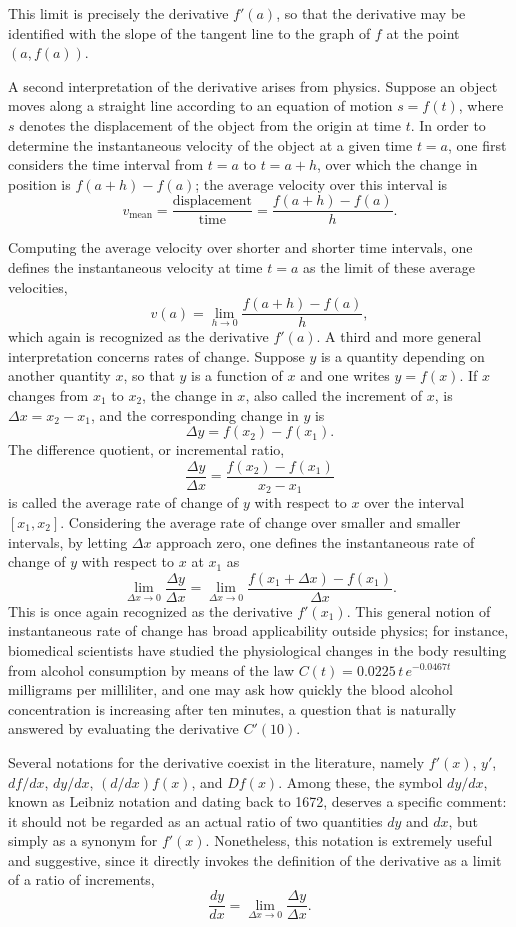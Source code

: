 This limit is precisely the derivative $f'(a)$, so that the derivative may be identified with the slope of the tangent line to the graph of $f$ at the point $(a, f(a))$.

A second interpretation of the derivative arises from physics. Suppose an object moves along a straight line according to an equation of motion $s = f(t)$, where $s$ denotes the displacement of the object from the origin at time $t$. In order to determine the instantaneous velocity of the object at a given time $t = a$, one first considers the time interval from $t = a$ to $t = a + h$, over which the change in position is $f(a+h) - f(a)$; the average velocity over this interval is
\[
v_{\text{mean}} = \frac{\text{displacement}}{\text{time}} = \frac{f(a+h) - f(a)}{h}.
\]

Computing the average velocity over shorter and shorter time intervals, one defines the instantaneous velocity at time $t = a$ as the limit of these average velocities, \[
v(a) = \lim_{h \to 0} \frac{f(a+h) - f(a)}{h},
\] which again is recognized as the derivative $f'(a)$. A third and more general interpretation concerns rates of change. Suppose $y$ is a quantity depending on another quantity $x$, so that $y$ is a function of $x$ and one writes $y = f(x)$. If $x$ changes from $x_1$ to $x_2$, the change in $x$, also called the increment of $x$, is $\Delta x = x_2 - x_1$, and the corresponding change in $y$ is
\[
\Delta y = f(x_2) - f(x_1).
\]
The difference quotient, or incremental ratio,
\[
\frac{\Delta y}{\Delta x} = \frac{f(x_2) - f(x_1)}{x_2 - x_1}
\]
 is called the average rate of change of $y$ with respect to $x$ over the interval $[x_1, x_2]$. Considering the average rate of change over smaller and smaller intervals, by letting $\Delta x$ approach zero, one defines the instantaneous rate of change of $y$ with respect to $x$ at $x_1$ as
\[
\lim_{\Delta x \to 0} \frac{\Delta y}{\Delta x} = \lim_{\Delta x \to 0} \frac{f(x_1 + \Delta x) - f(x_1)}{\Delta x}.
\]
This is once again recognized as the derivative $f'(x_1)$. This general notion of instantaneous rate of change has broad applicability outside physics; for instance, biomedical scientists have studied the physiological changes in the body resulting from alcohol consumption by means of the law $C(t) = 0.0225 \, t \, e^{-0.0467 t}$ milligrams per milliliter, and one may ask how quickly the blood alcohol concentration is increasing after ten minutes, a question that is naturally answered by evaluating the derivative $C'(10)$.

Several notations for the derivative coexist in the literature, namely $f'(x)$, $y'$, $df/dx$, $dy/dx$, $(d/dx) f(x)$, and $Df(x)$. Among these, the symbol $dy/dx$, known as Leibniz notation and dating back to 1672, deserves a specific comment: it should not be regarded as an actual ratio of two quantities $dy$ and $dx$, but simply as a synonym for $f'(x)$. Nonetheless, this notation is extremely useful and suggestive, since it directly invokes the definition of the derivative as a limit of a ratio of increments,
\[
\frac{dy}{dx} = \lim_{\Delta x \to 0} \frac{\Delta y}{\Delta x}.
\]

